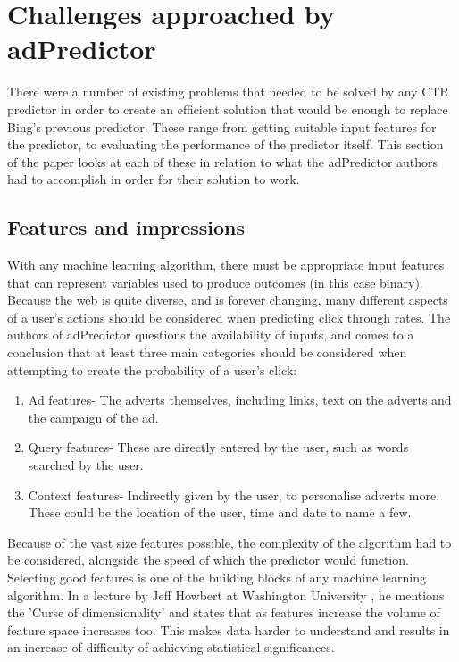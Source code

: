 \documentclass[journal]{IEEEtran}
\begin{document}
\section{Challenges approached by adPredictor}
There were a number of existing problems that needed to be solved by any CTR predictor in order to create an efficient solution that would be enough to replace Bing's previous predictor. These range from getting suitable input features for the predictor, to evaluating the performance of the predictor itself. This section of the paper looks at each of these in relation to what the adPredictor authors had to accomplish in order for their solution to work.

\subsection{Features and impressions}
With any machine learning algorithm, there must be appropriate input features that can represent variables used to produce outcomes (in this case binary). Because the web is quite diverse, and is forever changing, many different aspects of a user's actions should be considered when predicting click through rates. The authors of adPredictor questions the availability of inputs, and comes to a conclusion that at least three main categories should be considered when attempting to create the probability of a user's click:
\begin{enumerate}
\item Ad features- The adverts themselves, including links, text on the adverts and the campaign of the ad.
\item Query features- These are directly entered by the user, such as words searched by the user.
\item Context features- Indirectly given by the user, to personalise adverts more. These could be the location of the user, time and date to name a few.
\end{enumerate}
Because of the vast size features possible, the complexity of the algorithm had to be considered, alongside the speed of which the predictor would function. Selecting good features is one of the building blocks of any machine learning algorithm. In a lecture by Jeff Howbert at Washington University \cite{washington}, he mentions the 'Curse of dimensionality' and states that as features increase the volume of feature space increases too. This makes data harder to understand and results in an increase of difficulty of achieving statistical significances.
\end{document}
